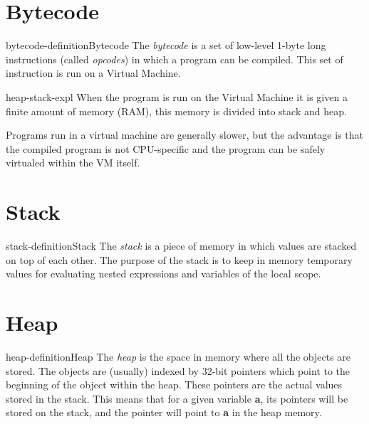 \documentclass[preview]{standalone}
\begin{document}
\genpage

\section{Bytecode}

\begin{snippetdefinition}{bytecode-definition}{Bytecode}
    The \textit{bytecode} is a set of low-level 1-byte long instructions (called \textit{opcodes})
    in which a program can be compiled. This set of instruction is run on a Virtual Machine.
\end{snippetdefinition}

\begin{snippet}{heap-stack-expl}
    When the program is run on the Virtual Machine it is given a finite amount of memory (RAM),
    this memory is divided into stack and heap.

    Programs run in a virtual machine are generally slower, but the advantage is that the
    compiled program is not CPU-specific and the program can be safely virtualed within the VM itself.
\end{snippet}

\section{Stack}

\begin{snippetdefinition}{stack-definition}{Stack}
    The \textit{stack} is a piece of memory in which values are stacked on top of each other.
    The purpose of the stack is to keep in memory temporary values for evaluating nested expressions and
    variables of the local scope.
\end{snippetdefinition}

\section{Heap}

\begin{snippetdefinition}{heap-definition}{Heap}
    The \textit{heap} is the space in memory where all the objects are stored.
    The objects are (usually) indexed by 32-bit pointers which point to the beginning of the object within the heap.
    These pointers are the actual values stored in the stack.
    This means that for a given variable \textbf{a}, its pointers will be stored on the stack, and the pointer will point to \textbf{a} in the heap memory.
\end{snippetdefinition}
\end{document}
